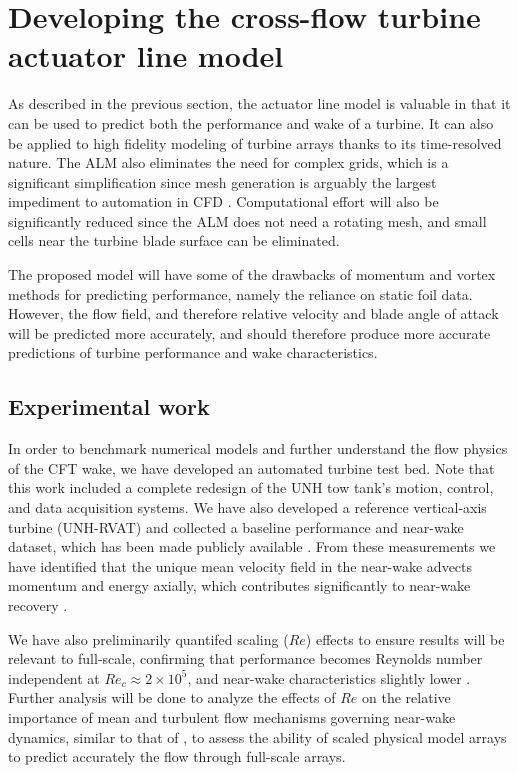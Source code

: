 \section{Developing the cross-flow turbine actuator line model}

As described in the previous section, the actuator line model is valuable in
that it can be used to predict both the performance and wake of a turbine. It
can also be applied to high fidelity modeling of turbine arrays thanks to its
time-resolved nature. The ALM also eliminates the need for complex grids, which
is a significant simplification since mesh generation is arguably the largest
impediment to automation in CFD \cite{Slotnick2014}. Computational effort will
also be significantly reduced since the ALM does not need a rotating mesh, and
small cells near the turbine blade surface can be eliminated.

The proposed model will have some of the drawbacks of momentum and vortex
methods for predicting performance, namely the reliance on static foil data.
However, the flow field, and therefore relative velocity and blade angle of
attack will be predicted more accurately, and should therefore produce more
accurate predictions of turbine performance and wake characteristics.

\subsection{Experimental work}

In order to benchmark numerical models and further understand the flow physics
of the CFT wake, we have developed an automated turbine test bed. Note that this
work included a complete redesign of the UNH tow tank's motion, control, and
data acquisition systems. We have also developed a reference vertical-axis
turbine (UNH-RVAT) and collected a baseline performance and near-wake dataset,
which has been made publicly available \cite{Bachant2014-RVAt-baseline}. From
these measurements we have identified that the unique mean velocity field in the
near-wake advects momentum and energy axially, which contributes significantly
to near-wake recovery \cite{Bachant2015-JoT}.

We have also preliminarily quantifed scaling ($Re$) effects to ensure results
will be relevant to full-scale, confirming that performance becomes Reynolds
number independent at $Re_c \approx 2 \times 10^5$, and near-wake
characteristics slightly lower \cite{Bachant2014}. Further analysis will be done
to analyze the effects of $Re$ on the relative importance of mean and turbulent
flow mechanisms governing near-wake dynamics, similar to that of
\cite{Bachant2015-JoT}, to assess the ability of scaled physical model arrays to
predict accurately the flow through full-scale arrays.

